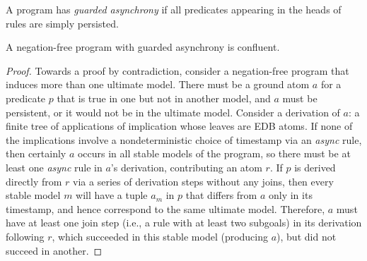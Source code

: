 
\begin{definition}
A \lang program has {\em guarded asynchrony} if all predicates 
appearing in the heads of  rules
are simply persisted.
\end{definition}



\begin{lemma}
\label{lem:guarding}
A negation-free \lang program with guarded asynchrony is confluent.
\end{lemma}
\begin{proof}


Towards a proof by contradiction, consider a negation-free \lang program that 
induces more than one ultimate model.  There must be a ground atom $a$ for a predicate $p$
that is true in one but
not in another model, and $a$ must be persistent, or it would not be
in the ultimate model.  Consider a derivation of $a$: a finite tree of applications of
implication whose leaves are EDB atoms.  If none of the implications involve a nondeterministic
choice of timestamp via an {\em async} rule, then certainly 
$a$ occurs in all stable models of the program,
so there must be at least one {\em async} rule in $a$'s derivation, contributing an atom
$r$.  
If $p$ is derived directly from 
$r$ via a series of derivation steps without any joins, then every stable
model $m$ will have a tuple $a_m$ in $p$ that differs from $a$ only in its timestamp, 
and hence correspond to the same ultimate model.
Therefore, $a$ must have at least one join step (i.e., a rule with at least two subgoals)
in its derivation following $r$,
which succeeded in this stable model (producing $a$), but did not succeed in another.  


\end{proof}
